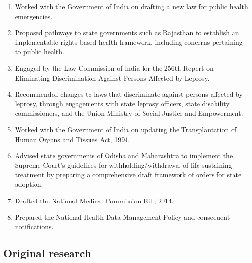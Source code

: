 \documentclass[a4paper,11pt]{article}
\begin{document}
    \begin{enumerate}
        \item Worked with the Government of India on drafting a new law for public health emergencies.
        \item Proposed pathways to state governments such as Rajasthan to establish an implementable rights-based health framework, including concerns pertaining to public health.
        \item Engaged by the Law Commission of India for the 256th Report on Eliminating Discrimination Against Persons Affected by Leprosy. 
        \item Recommended changes to laws that discriminate against persons affected by leprosy, through engagements with state leprosy officers, state disability commissioners, and the Union Ministry of Social Justice and Empowerment. 
        \item Worked with the Government of India on updating the Transplantation of Human Organs and Tissues Act, 1994. 
        \item Advised state governments of Odisha and Maharashtra to implement the Supreme Court’s guidelines for withholding/withdrawal of life-sustaining treatment by preparing a comprehensive draft framework of orders for state adoption.
        \item Drafted the National Medical Commission Bill, 2014.
        \item Prepared the National Health Data Management Policy and consequent notifications.
    \end{enumerate}
    
    \subsection{Original research}
    
\end{document}
